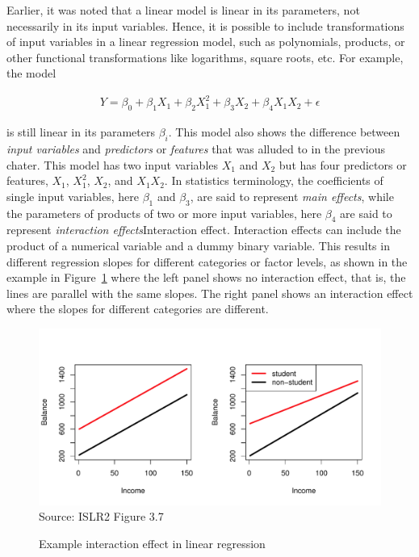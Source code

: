 Earlier, it was noted that a linear model is linear in its parameters, not necessarily in its input variables. Hence, it is possible to include transformations of input variables in a linear regression model, such as polynomials, products, or other functional transformations like logarithms, square roots, etc. For example, the model

\begin{align*}
Y = \beta_0 + \beta_1 X_1 + \beta_2 X_1^2 + \beta_3 X_2 + \beta_4 X_1 X_2 + \epsilon
\end{align*}

\noindent is still linear in its parameters $\beta_i$. This model also shows the difference between \emph{input variables} and \emph{predictors} or \emph{features} that was alluded to in the previous chater. This model has two input variables $X_1$ and $X_2$ but has four predictors or features, $X_1$, $X_1^2$, $X_2$, and $X_1 X_2$. In statistics terminology, the coefficients of single input variables, here $\beta_1$ and $\beta_3$, are said to represent \emph{main effects}, while the parameters of products of two or more input variables, here $\beta_4$ are said to represent \emph{interaction effects}{Interaction effect}. Interaction effects can include the product of a numerical variable and a dummy binary variable. This results in different regression slopes for different categories or factor levels, as shown in the example in Figure~\ref{fig:groupinteraction} where the left panel shows no interaction effect, that is, the lines are parallel with the same slopes. The right panel shows an interaction effect where the slopes for different categories are different.

\begin{figure}
\centering
\includegraphics[width=.9\textwidth]{../class11/Figures_Chapters_1-6/Chapter3/3_7.pdf} \\

\scriptsize Source: ISLR2 Figure 3.7
\caption{Example interaction effect in linear regression}
\label{fig:groupinteraction}
\end{figure}


